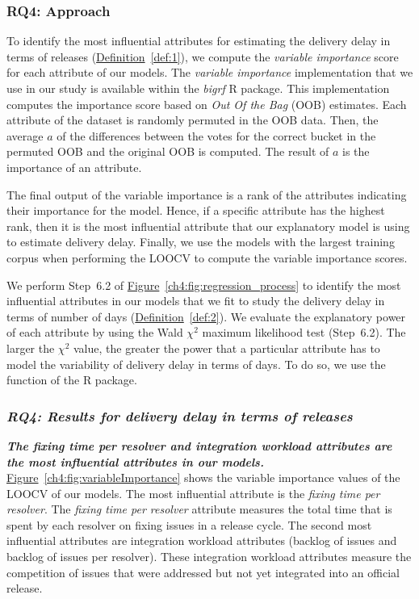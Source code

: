\subsubsection*{RQ4: Approach}

To identify the most influential attributes for estimating the delivery delay
in terms of releases (\hyperref[def:1]{Definition}~\ref{def:1}), we compute the
\textit{variable importance} score for each attribute of our models. The
\textit{variable importance} implementation that we use in our study is
available within the \textit{bigrf} R package. This implementation computes the
importance score based on {\em Out Of the Bag} (OOB) estimates. Each attribute
of the dataset is randomly permuted in the OOB data.  Then, the average \(a\) of
the differences between the votes for the correct bucket in the permuted OOB and
the original OOB is computed. The result of \(a\) is the importance of an
attribute. 

The final output of the variable importance is a rank of the attributes
indicating their importance for the model. Hence, if a specific attribute has
the highest rank, then it is the most influential attribute that our explanatory
model is using to estimate delivery delay. Finally, we use the models with the
largest training corpus when performing the LOOCV to compute the variable
importance scores.

We perform Step~6.2 of
\hyperref[ch4:fig:regression_process]{Figure}~\ref{ch4:fig:regression_process} to
identify the most influential attributes in our models that we fit to study the
delivery delay in terms of number of days
(\hyperref[def:2]{Definition}~\ref{def:2}). We evaluate the explanatory power of
each attribute by using the Wald $\chi^2$ maximum likelihood test (Step~6.2).
The larger the $\chi^2$ value, the greater the power that a particular attribute
has to model the variability of delivery delay in terms of days. To do so, we
use the  function of the  R package.

\subsubsection*{\textit{\textbf{RQ4: Results for delivery delay in terms of
releases}}}

\noindent\textit{\textbf{The fixing time per resolver and integration workload
attributes are the most influential attributes in our models.}}
\hyperref[ch4:fig:variableImportance]{Figure}~\ref{ch4:fig:variableImportance} shows the
variable importance values of the LOOCV of our models. The most influential
attribute is the \textit{fixing time per resolver}. The \textit{fixing time per
resolver} attribute measures the total time that is spent by each resolver on
fixing issues in a release cycle. The second most influential attributes are
integration workload attributes (\ie backlog of issues and backlog of issues per
resolver). These integration workload attributes measure the competition of
issues that were addressed but not yet integrated into an official release.

